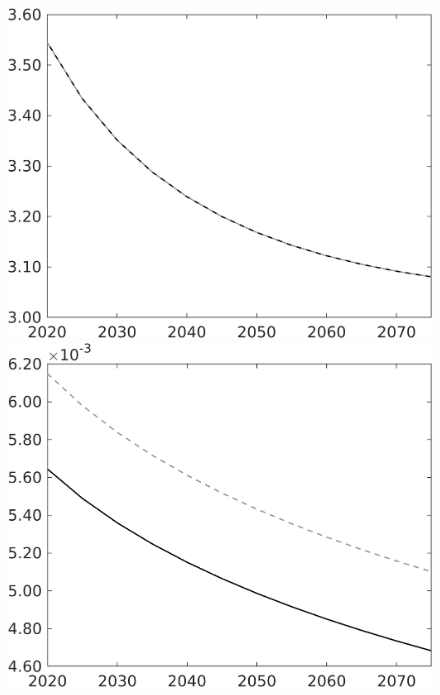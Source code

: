 \documentclass[12pt]{article}
\begin{document}
\begin{figure}[h!!]
\begin{minipage}[]{0.32\textwidth}
	\end{minipage}	
	\begin{minipage}[]{0.32\textwidth}
		\includegraphics[width=1\textwidth]{../../codding_model/own_basedOnFried/optimalPol_010922_revision/figures/all_13Sept22/CompTaul_LFBAU_Reg0_pgpftf_spillover0_nsk1_xgr1_knspil0_sep1_countec0_GovRev0_etaa0.79_lgd0.png}
	\end{minipage}	
	\begin{minipage}[]{0.32\textwidth}
		\includegraphics[width=1\textwidth]{../../codding_model/own_basedOnFried/optimalPol_010922_revision/figures/all_13Sept22/CompTaul_LFBAU_Reg0_Lf_spillover0_nsk1_xgr1_knspil0_sep1_countec0_GovRev0_etaa0.79_lgd0.png}

\end{minipage}
\end{figure}
\end{document}
